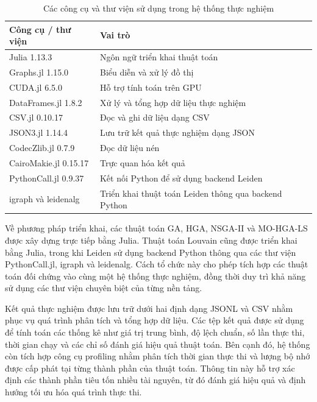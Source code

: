 \documentclass[14pt,a4paper]{extarticle}
\begin{document}
\begin{table}[H]
    \centering
    \caption{Các công cụ và thư viện sử dụng trong hệ thống thực nghiệm}
    \renewcommand{\arraystretch}{1.3}
    \begin{tabularx}{\textwidth}{
        |>{\raggedright\arraybackslash}p{}
        |>{\raggedright\arraybackslash}X|
    }
        \hline
        \textbf{Công cụ / thư viện} & \textbf{Vai trò} \\ \hline
        Julia 1.13.3 & Ngôn ngữ triển khai thuật toán \\ \hline
        Graphs.jl 1.15.0 & Biểu diễn và xử lý đồ thị \\ \hline
        CUDA.jl 6.5.0 & Hỗ trợ tính toán trên GPU \\ \hline
        DataFrames.jl 1.8.2 & Xử lý và tổng hợp dữ liệu thực nghiệm \\ \hline
        CSV.jl 0.10.17 & Đọc và ghi dữ liệu dạng CSV \\ \hline
        JSON3.jl 1.14.4 & Lưu trữ kết quả thực nghiệm dạng JSON \\ \hline
        CodecZlib.jl 0.7.9 & Đọc dữ liệu nén \\ \hline
        CairoMakie.jl 0.15.17 & Trực quan hóa kết quả \\ \hline
        PythonCall.jl 0.9.37 & Kết nối Python để sử dụng backend Leiden \\ \hline
        igraph và leidenalg & Triển khai thuật toán Leiden thông qua backend Python \\ \hline
    \end{tabularx}
    \label{tab:experimental_tools}
\end{table}

Về phương pháp triển khai, các thuật toán GA, HGA, NSGA-II và MO-HGA-LS được xây dựng trực tiếp bằng Julia. Thuật toán Louvain cũng được triển khai bằng Julia, trong khi Leiden sử dụng backend Python thông qua các thư viện PythonCall.jl, igraph và leidenalg. Cách tổ chức này cho phép tích hợp các thuật toán đối chứng vào cùng một hệ thống thực nghiệm, đồng thời duy trì khả năng sử dụng các thư viện chuyên biệt của từng nền tảng.

Kết quả thực nghiệm được lưu trữ dưới hai định dạng JSONL và CSV nhằm phục vụ quá trình phân tích và tổng hợp dữ liệu. Các tệp kết quả được sử dụng để tính toán các thống kê như giá trị trung bình, độ lệch chuẩn, số lần thực thi, thời gian chạy và các chỉ số đánh giá hiệu quả thuật toán. Bên cạnh đó, hệ thống còn tích hợp công cụ profiling nhằm phân tích thời gian thực thi và lượng bộ nhớ được cấp phát tại từng thành phần của thuật toán. Thông tin này hỗ trợ xác định các thành phần tiêu tốn nhiều tài nguyên, từ đó đánh giá hiệu quả và định hướng tối ưu hóa quá trình thực thi.
\end{document}
